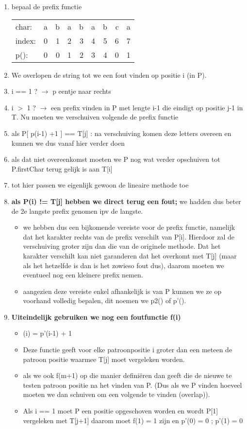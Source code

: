 \begin{enumerate}
\item bepaal de prefix functie
\begin{tabular}{lrrrrrrrr}
char: &a &b &a &b &a &b &c &a \\
index:&0 &1 &2 &3 &4 &5 &6 &7 \\
p():  &0 &0 &1 &2 &3 &4 &0 &1
\end{tabular}
\item We overlopen de string tot we een fout vinden op positie i (in P).
\item i == 1 ? $\rightarrow$ p eentje naar rechts
\item i $>$ 1  ? $\rightarrow$ een prefix vinden in P met lengte i-1 die eindigt op positie j-1 in T. Nu moeten we verschuiven volgende de prefix functie
\item als P[ p(i-1) +1 ] == T[j] : na verschuiving komen deze letters overeen en kunnen we dus vanaf hier verder doen
\item als dat niet overeenkomst moeten we P nog wat verder opschuiven tot P.firstChar terug gelijk is aan T[i]
\item tot hier passen we eigenlijk gewoon de lineaire methode toe

\item \textbf{als P(i) != T[j] hebben we direct terug een fout;} we hadden dus beter de 2e langste prefix genomen ipv de langste.
\begin{itemize}
\item we hebben dus een bijkomende vereiste voor de prefix functie, namelijk dat het karakter rechts van de prefix verschilt van P[i]. Hierdoor zal de verschuiving groter zijn dan die van de originele methode. Dat het karakter verschilt kan niet garanderen dat het overkomt met T[j] (maar als het hetzelfde is dan is het zowieso fout dus), daarom moeten we eventueel nog een kleinere prefix nemen.
\item aangezien deze vereiste enkel afhankelijk is van P kunnen we ze op voorhand volledig bepalen, dit noemen we p2() of p'().
\end{itemize}

\item \textbf{Uiteindelijk gebruiken we nog een foutfunctie f(i)}
\begin{itemize}
\item (i) = p'(i-1) + 1
\item Deze functie geeft voor elke patroonpositie i groter dan een meteen de patroon positie waarmee T[j] moet vergeleken worden.
\item als we ook f(m+1) op die manier defini\"eren dan geeft die de nieuwe te testen patroon positie na het vinden van P. (Dus als we P vinden hoeveel moeten we dan schuiven om een volgende te vinden (overlap)).
\item Als i == 1 moet P een positie opgeschoven worden en wordt P[1] vergeleken met T[j+1] daarom moet f(1) = 1 zijn en p'(0) = 0 ; p'(1)  = 0
\end{itemize}
\end{enumerate}

